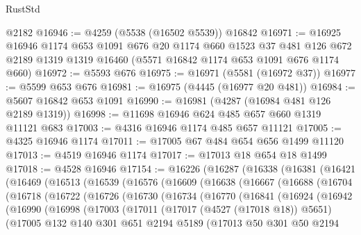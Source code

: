 \begin{lexlean}{RustStd}
\begin{coremodule}
    @2182
@16946 := @4259 (@5538 (@16502 @5539)) @16842
@16971 := @16925
    @16946
    @1174
    @653
    @1091
    @676
    @20
    @1174
    @660
    @1523
    @37
    @481
    @126
    @672
    @2189
    @1319
    @1319
    @16460
    (@5571 @16842 @1174 @653 @1091 @676 @1174 @660)
@16972 := @5593 @676
@16975 := @16971 (@5581 (@16972 @37))
@16977 := @5599 @653 @676
@16981 := @16975 (@4445 (@16977 @20 @481))
@16984 := @5607 @16842 @653 @1091
@16990 := @16981 (@4287 (@16984 @481 @126 @2189 @1319))
@16998 := @11698 @16946 @624 @485 @657 @660 @1319 @11121 @683
@17003 := @4316 @16946 @1174 @485 @657 @11121
@17005 := @4325 @16946 @1174
@17011 := @17005 @67 @484 @654 @656 @1499 @11120
@17013 := @4519 @16946 @1174
@17017 := @17013 @18 @654 @18 @1499
@17018 := @4528 @16946
@17154 := @16226
    (@16287
      (@16338
        (@16381
          (@16421
            (@16469
              (@16513
                (@16539
                  (@16576
                    (@16609
                      (@16638
                        (@16667
                          (@16688
                            (@16704
                              (@16718
                                (@16722
                                  (@16726
                                    (@16730
                                      (@16734
                                        (@16770
                                          (@16841
                                            (@16924
                                              (@16942
                                                (@16990
                                                  (@16998
                                                    (@17003
                                                      (@17011
                                                        (@17017 (@4527 (@17018 @18)) @5651)
                                                        (@17005
                                                          @132
                                                          @140
                                                          @301
                                                          @651
                                                          @2194
                                                          @5189
                                                          (@17013
                                                            @50
                                                            @301
                                                            @50
                                                            @2194

\end{coremodule}
\end{lexlean}
